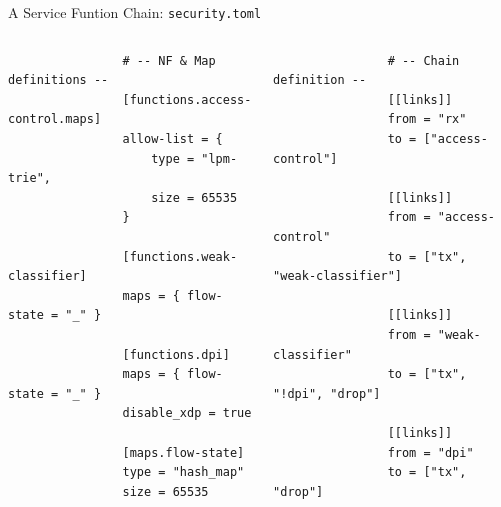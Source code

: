 \documentclass[aspectratio=169,xcolor={dvipsnames}
]{beamer}
\begin{document}
\begin{frame}[fragile=singleslide]{A Service Funtion Chain: \texttt{security.toml}}
	\begin{columns}
		\begin{column}{0.5\linewidth}
			\begin{verbatim}
				# -- NF & Map definitions --
				[functions.access-control.maps]
				allow-list = {
					type = "lpm-trie",
					size = 65535
				}
				
				[functions.weak-classifier]
				maps = { flow-state = "_" }
				
				[functions.dpi]
				maps = { flow-state = "_" }
				disable_xdp = true
				
				[maps.flow-state]
				type = "hash_map"
				size = 65535
			\end{verbatim}
		\end{column}
		\begin{column}{0.5\linewidth}
			\begin{verbatim}
				# -- Chain definition --
				[[links]]
				from = "rx"
				to = ["access-control"]
				
				[[links]]
				from = "access-control"
				to = ["tx", "weak-classifier"]
				
				[[links]]
				from = "weak-classifier"
				to = ["tx", "!dpi", "drop"]
				
				[[links]]
				from = "dpi"
				to = ["tx", "drop"]
			\end{verbatim}
		\end{column}
	\end{columns}
\end{frame}
\end{document}
